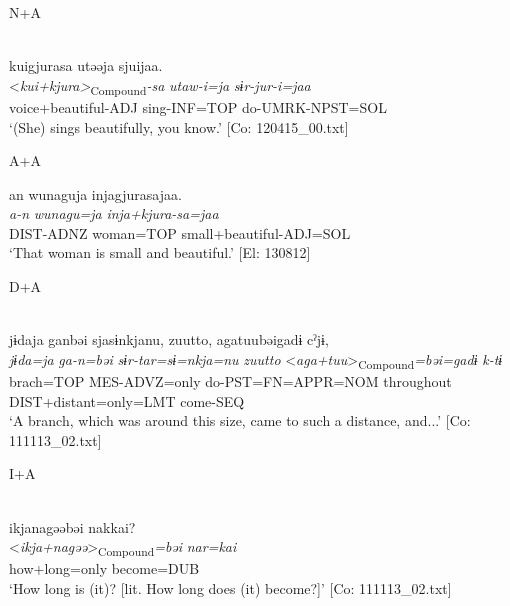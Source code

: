 \ea 
\exi{} N+A \label{ex:4.26}

\ea{}\\
\glll    kuigjurasa  utəəja  sjuijaa.\\
      <\textit{kui+kjura>}\textsubscript{Compound}\textit{{}-sa}  \textit{utaw-i=ja}  \textit{sɨr-jur-i=jaa}\\
      voice+beautiful-ADJ  sing-INF=TOP  do-UMRK-NPST=SOL\\
      \glt       ‘(She) sings beautifully, you know.’ [Co: 120415\_00.txt]

\exi{} A+A

\ex\label{ex:4.26b}  
     \glll  an  wunaguja  injagjurasajaa.\\
      \textit{a-n}  \textit{wunagu=ja}  \textit{inja+kjura-sa=jaa}\\
      DIST-ADNZ  woman=TOP  small+beautiful-ADJ=SOL\\
      \glt       ‘That woman is small and beautiful.’ [El: 130812]

\exi{} D+A

\ex{}\\\label{ex:4.26c}
\glll     jɨdaja  ganbəi  sjasɨnkjanu,  {\textbar}zuutto{\textbar},   agatuubəigadɨ  cˀjɨ,\\
      \textit{jɨda=ja}  \textit{ga-n=bəi}  \textit{sɨr-tar=sɨ=nkja=nu}  \textit{zuutto}     <\textit{aga+tuu}>\textsubscript{Compound}\textit{=bəi=gadɨ}  \textit{k-tɨ}\\
      brach=TOP  MES-ADVZ=only  do-PST=FN=APPR=NOM  throughout   DIST+distant=only=LMT  come-SEQ     \\
    \glt       ‘A branch, which was around this size, came to such a distance, and...’ [Co: 111113\_02.txt]

\exi{}  I+A

\ex{}\\\label{ex:4.26d}
\glll     ikjanagəəbəi  nakkai?\\
      <\textit{ikja+nagəə}>\textsubscript{Compound}\textit{=bəi}  \textit{nar=kai}\\
      how+long=only  become=DUB\\
    \glt       ‘How long is (it)? [lit. How long does (it) become?]’ [Co: 111113\_02.txt]

